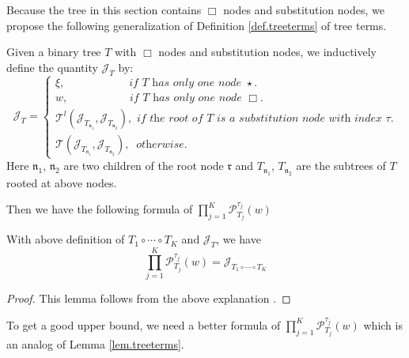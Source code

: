 Because the tree in this section contains $\Box$ nodes and substitution nodes, we propose the following generalization of Definition \ref{def.treeterms} of tree terms.

\begin{defn}\label{def.treetermsoperator} Given a binary tree $T$ with $\Box$ nodes and substitution nodes, we inductively define the quantity $\mathcal{J}_T$ by:
\begin{equation}\label{eq.treetermoperator}
    \mathcal{J}_T=
    \begin{cases}
    \xi, \qquad\qquad\quad\ \   \textit{ if $T$ has only one node $\star$.}
    \\
    w, \qquad\qquad\quad\ \textit{ if $T$ has only one node $\Box$.}
    \\
    \mathcal{T}^l(\mathcal{J}_{T_{\mathfrak{n}_1}}, \mathcal{J}_{T_{\mathfrak{n}_2}}), \textit{ if the root of $T$ is a substitution node with index $\tau$.}
    \\
    \mathcal{T}(\mathcal{J}_{T_{\mathfrak{n}_1}}, \mathcal{J}_{T_{\mathfrak{n}_2}}),\  \textit{ otherwise.}
    \end{cases}
\end{equation}
Here $\mathfrak{n}_1$, $\mathfrak{n}_2$ are two children of the root node $\mathfrak{r}$ and $T_{\mathfrak{n}_1}$, $T_{\mathfrak{n}_2}$ are the subtrees of $T$ rooted at above nodes.
\end{defn}

Then we have the following formula of $\prod_{j=1}^K\mathcal{P}^{\tau_j}_{T_j}(w)$

\begin{lem}
With above definition of $T_1\circ \cdots \circ T_{K}$ and $\mathcal{J}_T$, we have 
\begin{equation}\label{eq.operatoreqsimple}
    \prod_{j=1}^K\mathcal{P}^{\tau_j}_{T_j}(w)=\mathcal{J}_{T_1\circ \cdots \circ T_{K}}
\end{equation}
\end{lem}
\begin{proof}
This lemma follows from the above explanation .
\end{proof}

To get a good upper bound, we need a better formula of $\prod_{j=1}^K\mathcal{P}^{\tau_j}_{T_j}(w)$ which is an analog of Lemma \ref{lem.treeterms}. 

